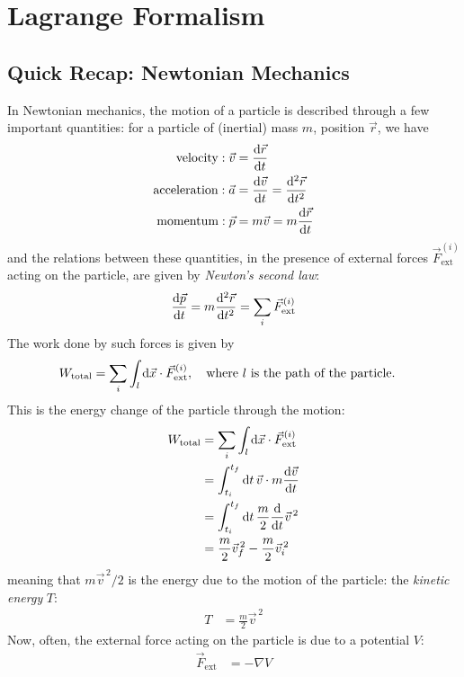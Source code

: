 \section{Lagrange Formalism}
\subsection{Quick Recap: Newtonian Mechanics}
In Newtonian mechanics, the motion of a particle is described through a few important quantities:
for a particle of (inertial) mass $m$, position $\vec{r}$, we have
\begin{align}
  \text{velocity}: \vec{v}     & = \odv{\vec{r}}{t}                       \\
  \text{acceleration}: \vec{a} & = \odv{\vec{v}}{t} = \odv[2]{\vec{r}}{t} \\
  \text{momentum}: \vec{p}     & = m\vec{v} = m\odv{\vec{r}}{t}
\end{align}
and the relations between these quantities, in the presence of external forces $\vec{F}_{\text{ext}}^{(i)}$ acting on the particle, are given by \textit{Newton's second law}:
\begin{align}
  \odv{\vec{p}}{t} = m \odv[2]{\vec{r}}{t} = \sum_i \vec{F}_{\text{ext}}^{(i)}
\end{align}
The work done by such forces is given by
\begin{align}
  W_{\text{total}} & = \sum_i \int_l \odif{\vec{x}} \cdot \vec{F}_{\text{ext}}^{(i)}, \quad \text{where } l \text{ is the path of the particle.}
\end{align}
This is the energy change of the particle through the motion:
\begin{align}
  W_{\text{total}}
   & = \sum_i \int_l \odif{\vec{x}} \cdot \vec{F}_{\text{ext}}^{(i)}     \\
   & = \int_{t_i}^{t_f} \odif{t} \, \vec{v} \cdot m \odv{\vec{v}}{t}     \\
   & = \int_{t_i}^{t_f} \odif{t} \, \frac{m}{2} \odv{}{t} \vec{v}^{\, 2} \\
   & = \frac{m}{2} \vec{v}_f^{\, 2} - \frac{m}{2} \vec{v}_i^{\, 2}
\end{align}
meaning that $m \vec{v}^{\, 2} / 2$ is the energy due to the motion of the particle: the \emph{kinetic energy} $T$:
\begin{align}
  T & = \frac{m}{2} \vec{v}^{\, 2}
\end{align}
Now, often, the external force acting on the particle is due to a potential $V$:
\begin{align}
  \vec{F}_{\text{ext}} & = -\nabla V
\end{align}
